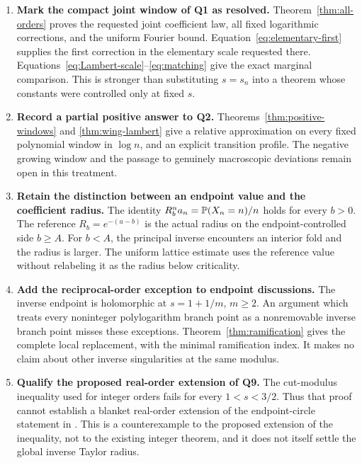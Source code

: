 \begin{enumerate}[label=\textbf{A\arabic*.},leftmargin=*]
\item \textbf{Mark the compact joint window of Q1 as resolved.}
Theorem~\ref{thm:all-orders} proves the requested joint coefficient
law, all fixed logarithmic corrections, and the uniform Fourier
bound. Equation~\eqref{eq:elementary-first} supplies the first
correction in the elementary scale requested there.
Equations~\eqref{eq:Lambert-scale}--\eqref{eq:matching} give the
exact marginal comparison. This is stronger than substituting
$s=s_n$ into a theorem whose constants were controlled only at
fixed $s$.

\item \textbf{Record a partial positive answer to Q2.}
Theorems~\ref{thm:positive-windows} and \ref{thm:wing-lambert}
give a relative approximation on every fixed polynomial window
in $\log n$, and an explicit transition profile. The negative
growing window and the passage to genuinely macroscopic
deviations remain open in this treatment.

\item \textbf{Retain the distinction between an endpoint value and
the coefficient radius.} The identity
$R_b^n a_n=\mathbb P(X_n=n)/n$ holds for every $b>0$.
The reference $R_b=e^{-(u-b)}$ is the actual radius on the
endpoint-controlled side $b\ge A$. For $b<A$, the principal
inverse encounters an interior fold and the radius is larger.
The uniform lattice estimate uses the reference value without
relabeling it as the radius below criticality.

\item \textbf{Add the reciprocal-order exception to endpoint
discussions.} The inverse endpoint is holomorphic at
$s=1+1/m$, $m\ge2$. An argument which treats every noninteger
polylogarithm branch point as a nonremovable inverse branch
point misses these exceptions. Theorem~\ref{thm:ramification}
gives the complete local replacement, with the minimal
ramification index. It makes no claim about other inverse
singularities at the same modulus.

\item \textbf{Qualify the proposed real-order extension of Q9.}
The cut-modulus inequality used for integer orders fails for
every $1<s<3/2$. Thus that proof cannot establish a blanket
real-order extension of the endpoint-circle statement in
\cite{repo-inverse}. This is a counterexample to the proposed
extension of the inequality, not to the existing integer theorem,
and it does not itself settle the global inverse Taylor radius.


\end{enumerate}
